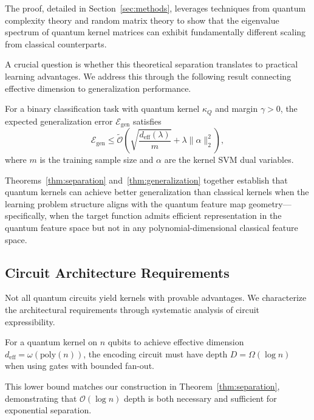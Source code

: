 \documentclass[aps,prb,reprint,superscriptaddress,showpacs]{revtex4-2}
\begin{document}
The proof, detailed in Section~\ref{sec:methods}, leverages techniques from quantum complexity theory and random matrix theory to show that the eigenvalue spectrum of quantum kernel matrices can exhibit fundamentally different scaling from classical counterparts.

A crucial question is whether this theoretical separation translates to practical learning advantages. We address this through the following result connecting effective dimension to generalization performance.

\begin{theorem}
\label{thm:generalization}
For a binary classification task with quantum kernel $\kappa_Q$ and margin $\gamma > 0$, the expected generalization error $\mathcal{E}_{\text{gen}}$ satisfies
\begin{equation}
    \mathcal{E}_{\text{gen}} \leq \tilde{\mathcal{O}}\left(\sqrt{\frac{d_{\text{eff}}(\lambda)}{m}} + \lambda \|\alpha\|_2^2\right),
\end{equation}
where $m$ is the training sample size and $\alpha$ are the kernel SVM dual variables.
\end{theorem}

Theorems~\ref{thm:separation} and~\ref{thm:generalization} together establish that quantum kernels can achieve better generalization than classical kernels when the learning problem structure aligns with the quantum feature map geometry---specifically, when the target function admits efficient representation in the quantum feature space but not in any polynomial-dimensional classical feature space.


\subsection{Circuit Architecture Requirements}

Not all quantum circuits yield kernels with provable advantages. We characterize the architectural requirements through systematic analysis of circuit expressibility.

\begin{proposition}
\label{prop:depth}
For a quantum kernel on $n$ qubits to achieve effective dimension $d_{\text{eff}} = \omega(\text{poly}(n))$, the encoding circuit must have depth $D = \Omega(\log n)$ when using gates with bounded fan-out.
\end{proposition}

This lower bound matches our construction in Theorem~\ref{thm:separation}, demonstrating that $\mathcal{O}(\log n)$ depth is both necessary and sufficient for exponential separation.
\end{document}
